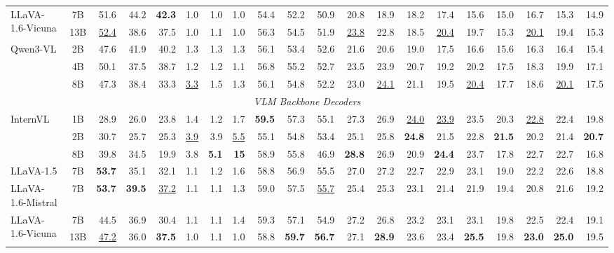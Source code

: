 \begin{table}[ht]
{\begin{tabular}{lcrrrrrrrrrrrrrrrrrr}
\multirow{2}{*}{LLaVA-1.6-Vicuna}
 & 7B  & 51.6 & 44.2 & \textbf{42.3} & 1.0 & 1.0 & 1.0 & 54.4 & 52.2 & 50.9 & 20.8 & 18.9 & 18.2 & 17.4 & 15.6 & 15.0 & 16.7 & 15.3 & 14.9 \\
 & 13B & \underline{52.4} & 38.6 & 37.5 & 1.0 & 1.1 & 1.0 & 56.3 & 54.5 & 51.9 & \underline{23.8} & 22.8 & 18.5 & \underline{20.4} & 19.7 & 15.3 & \underline{20.1} & 19.4 & 15.3 \\
\multirow{3}{*}{Qwen3-VL}
 & 2B  & 47.6 & 41.9 & 40.2 & 1.3 & 1.3 & 1.3 & 56.1 & 53.4 & 52.6 & 21.6 & 20.6 & 19.0 & 17.5 & 16.6 & 15.6 & 16.3 & 16.4 & 15.4 \\
 & 4B  & 50.1 & 37.5 & 38.7 & 1.2 & 1.2 & 1.1 & 56.8 & 55.2 & 52.7 & 23.5 & 23.9 & 20.7 & 19.2 & 20.2 & 17.5 & 18.3 & 19.9 & 17.1 \\
 & 8B  & 47.3 & 38.4 & 33.3 & \underline{3.3} & 1.5 & 1.3 & 56.1 & 54.8 & 52.2 & 23.0 & \underline{24.1} & 21.1 & 19.5 & \underline{20.4} & 17.7 & 18.6 & \underline{20.1} & 17.5 \\
\midrule
\multicolumn{20}{c}{\textit{VLM Backbone Decoders}} \\
\midrule
\multirow{3}{*}{InternVL}
 & 1B  & 28.9 & 26.0 & 23.8 & 1.4 & 1.2 & 1.7 & \textbf{59.5} & 57.3 & 55.1 & 27.3 & 26.9 & \underline{24.0} & \underline{23.9} & 23.5 & 20.3 & \underline{22.8} & 22.4 & 19.8 \\
 & 2B  & 30.7 & 25.7 & 25.3 & \underline{3.9} & 3.9 & \underline{5.5} & 55.1 & 54.8 & 53.4 & 25.1 & 25.8 & \textbf{24.8} & 21.5 & 22.8 & \textbf{21.5} & 20.2 & 21.4 & \textbf{20.7} \\
 & 8B  & 39.8 & 34.5 & 19.9 & 3.8 & \textbf{5.1} & \textbf{15} & 58.9 & 55.8 & 46.9 & \textbf{28.8} & 26.9 & 20.9 & \textbf{24.4} & 23.7 & 17.8 & 22.7 & 22.7 & 16.8 \\
LLaVA-1.5 & 7B & \textbf{53.7} & 35.1 & 32.1 & 1.1 & 1.2 & 1.6 & 58.8 & 56.9 & 55.5 & 27.0 & 27.2 & 22.7 & 22.9 & 23.1 & 19.0 & 22.2 & 22.6 & 18.8 \\
LLaVA-1.6-Mistral & 7B & \textbf{53.7} & \textbf{39.5} & \underline{37.2} & 1.1 & 1.1 & 1.3 & 59.0 & 57.5 & \underline{55.7} & 25.4 & 25.3 & 23.1 & 21.4 & 21.9 & 19.4 & 20.8 & 21.6 & 19.2 \\
\multirow{2}{*}{LLaVA-1.6-Vicuna}
 & 7B  & 44.5 & 36.9 & 30.4 & 1.1 & 1.1 & 1.4 & 59.3 & 57.1 & 54.9 & 27.2 & 26.8 & 23.2 & 23.1 & 23.1 & 19.8 & 22.5 & 22.4 & 19.1 \\
 & 13B & \underline{47.2} & 36.0 & \textbf{37.5} & 1.0 & 1.1 & 1.0 & 58.8 & \textbf{59.7} & \textbf{56.7} & 27.1 & \textbf{28.9} & 23.6 & 23.4 & \textbf{25.5} & 19.8 & \textbf{23.0} & \textbf{25.0} & 19.5 \\

\end{tabular}}
\end{table}
